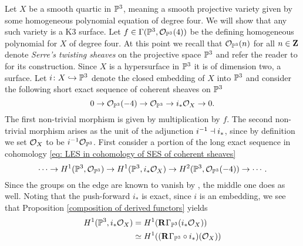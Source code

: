 \begin{example}
    Let $X$ be a smooth quartic in $\mathbb P^3$, meaning a smooth projective variety given by some homogeneous polynomial equation of degree four.
    We will show that any such variety is a K3 surface. Let $f \in \Gamma(\mathbb P^3, {\mathcal{O}_{\mathbb P^3}}(4))$ be the defining homogeneous polynomial for $X$ of degree four.
    At this point we recall that ${\mathcal{O}_{\mathbb P^3}}(n)$ for all $n \in \mathbf Z$ denote \emph{Serre's twisting sheaves} on the projective space $\mathbb P^3$ and refer the reader to \cite[\S II.5]{Hartshorne1977} for its construction.
    Since $X$ is a hypersurface in $\mathbb P^3$ it is of dimension two, \ie a surface. Let $i \colon X \hookrightarrow \mathbb P^3$ denote the closed embedding of $X$ into $\mathbb P^3$ and consider the following short exact sequence of coherent sheaves on $\mathbb P^3$
    \[
        0 \to {\mathcal{O}_{\mathbb P^3}}(-4) \to {\mathcal{O}_{\mathbb P^3}} \to i_*{\mathcal{O}_{X}} \to 0.
    \]
    The first non-trivial morphism is given by multiplication by $f$.
    The second non-trivial morphism arises as the unit of the adjunction $i^{-1} \dashv i_*$, since by definition we set ${\mathcal{O}_{X}}$ to be $i^{-1}{\mathcal{O}_{\mathbb P^3}}$.
    First consider a portion of the long exact sequence in cohomology \eqref{eq: LES in cohomology of SES of coherent sheaves}
    \[
        \cdots \to H^{1}(\mathbb P^3, {\mathcal{O}_{\mathbb P^3}}) \to H^{1}(\mathbb P^3, i_*{\mathcal{O}_{X}}) \to H^{2}(\mathbb P^3, {\mathcal{O}_{\mathbb P^3}}(-4)) \to \cdots.
    \]
    Since the groups on the edge are known to vanish by \cite[\S III, Theorem 5.1]{Hartshorne1977}, the middle one does as well. Noting that the push-forward $i_*$ is exact, since $i$ is an embedding, we see that Proposition \ref{composition of derived functors} yields
    \begin{align*}
        \cohom{1}{\PP^3}{i_*\struct{X}} &=
        H^1(\rderived{}{\Gamma_{\PP^3}}(i_*\struct{X})) \\
        &\iso H^1((\rderived{}{\Gamma_{\PP^3} \circ i_*})(\struct{X})) \\

\end{align*}
\end{example}
